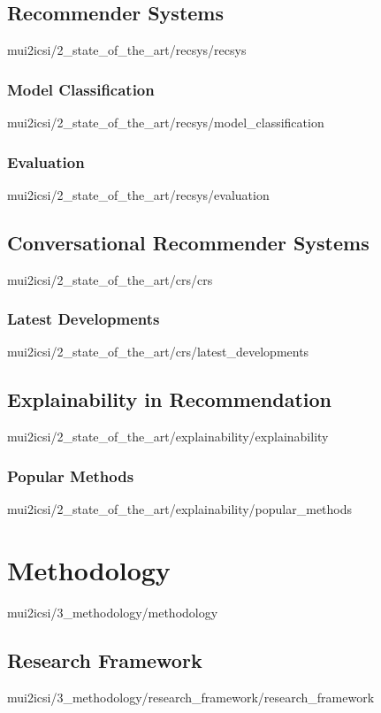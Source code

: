 \documentclass[english,epsbased,copyright,final,printable,covers,extendedindex,firstnumbered,tfm,gnuplot,loc,loe,lof,lot]{tfgtfmthesisuam}
\begin{document}
    \section{Recommender Systems\label{SEC:RECSYS}}{mui2icsi/2_state_of_the_art/recsys/recsys}
      \subsection{Model Classification\label{SS:MODELCLASS}}{mui2icsi/2_state_of_the_art/recsys/model_classification}
      \subsection{Evaluation\label{SS:RECSYSEVAL}}{mui2icsi/2_state_of_the_art/recsys/evaluation}

    \section{Conversational Recommender Systems\label{SEC:CRS}}{mui2icsi/2_state_of_the_art/crs/crs}
      \subsection{Latest Developments\label{SS:CRSDEVS}}{mui2icsi/2_state_of_the_art/crs/latest_developments}

    \section{Explainability in Recommendation\label{SEC:EXPLAINABILITY}}{mui2icsi/2_state_of_the_art/explainability/explainability}
      \subsection{Popular Methods\label{SS:POPMETHODS}}{mui2icsi/2_state_of_the_art/explainability/popular_methods}

  \chapter{Methodology\label{CAP:METHODOLOGY}}{mui2icsi/3_methodology/methodology}
    \section{Research Framework\label{SEC:RESEARCHFW}}{mui2icsi/3_methodology/research_framework/research_framework}
\end{document}
